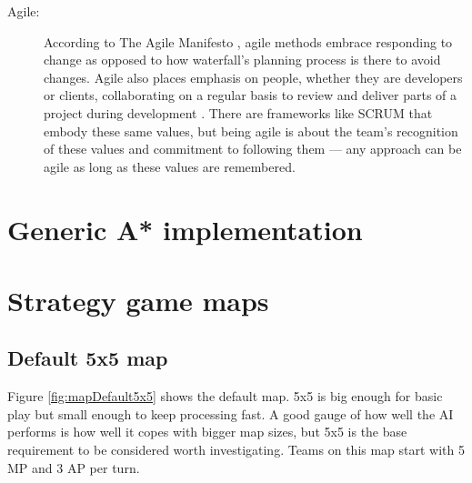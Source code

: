 \documentclass[11pt, a4paper]{report}
\begin{document}
\begin{appendices}
\begin{description}
  \item[Agile:] According to The Agile Manifesto \parencite[2]{fowler2001agile}, agile methods embrace responding to change as opposed to how waterfall's planning process is there to avoid changes. Agile also places emphasis on people, whether they are developers or clients, collaborating on a regular basis to review and deliver parts of a project during development \parencite[3]{fowler2001agile}. There are frameworks like SCRUM \parencite[1]{fowler2001agile} that embody these same values, but being agile is about the team's recognition of these values and commitment to following them --- any approach can be agile as long as these values are remembered.

\end{description}

\chapter{Generic A* implementation}
\label{appendix:genericAStarImplementation}

\linespread{0.8}

\linespread{1.5}

\chapter{Strategy game maps}
\label{appendix:strategyGameMaps}

\section{Default 5x5 map}
\label{sec:mapDefault5x5}

Figure \ref{fig:mapDefault5x5} shows the default map. 5x5 is big enough for basic play but small enough to keep processing fast. A good gauge of how well the AI performs is how well it copes with bigger map sizes, but 5x5 is the base requirement to be considered worth investigating. Teams on this map start with 5 MP and 3 AP per turn.


\end{appendices}
\end{document}
